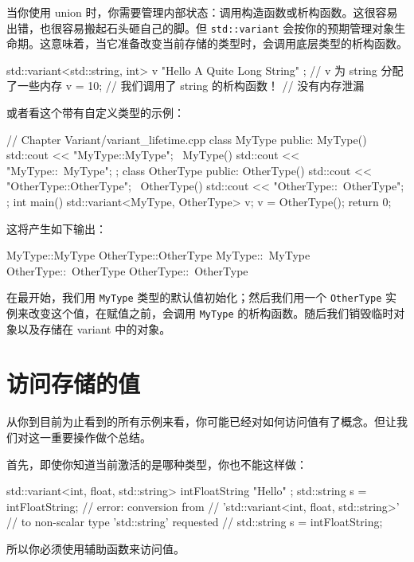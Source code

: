 当你使用 union 时，你需要管理内部状态：调用构造函数或析构函数。这很容易出错，也很容易搬起石头砸自己的脚。但 \texttt{std::variant} 会按你的预期管理对象生命期。这意味着，当它准备改变当前存储的类型时，会调用底层类型的析构函数。

\begin{codebox}[cpp]
std::variant<std::string, int> v { "Hello A Quite Long String" };
// v 为 string 分配了一些内存
v = 10; // 我们调用了 string 的析构函数！
// 没有内存泄漏
\end{codebox}

或者看这个带有自定义类型的示例：

\begin{codebox}[cpp]
// Chapter Variant/variant_lifetime.cpp
class MyType
{
public:
MyType() { std::cout << "MyType::MyType\n"; }
~MyType() { std::cout << "MyType::~MyType\n"; }
};
class OtherType
{
public:
OtherType() { std::cout << "OtherType::OtherType\n"; }
~OtherType() { std::cout << "OtherType::~OtherType\n"; }
};
int main()
{
std::variant<MyType, OtherType> v;
v = OtherType();
return 0;
}
\end{codebox}

这将产生如下输出：

\begin{codebox}
MyType::MyType
OtherType::OtherType
MyType::~MyType
OtherType::~OtherType
OtherType::~OtherType
\end{codebox}

在最开始，我们用 \texttt{MyType} 类型的默认值初始化；然后我们用一个 \texttt{OtherType} 实例来改变这个值，在赋值之前，会调用 \texttt{MyType} 的析构函数。随后我们销毁临时对象以及存储在 variant 中的对象。

\section{访问存储的值}

从你到目前为止看到的所有示例来看，你可能已经对如何访问值有了概念。但让我们对这一重要操作做个总结。

首先，即使你知道当前激活的是哪种类型，你也不能这样做：

\begin{codebox}[cpp]
std::variant<int, float, std::string> intFloatString { "Hello" };
std::string s = intFloatString;
// error: conversion from
// 'std::variant<int, float, std::string>'
// to non-scalar type 'std::string' requested
// std::string s = intFloatString;
\end{codebox}

所以你必须使用辅助函数来访问值。

